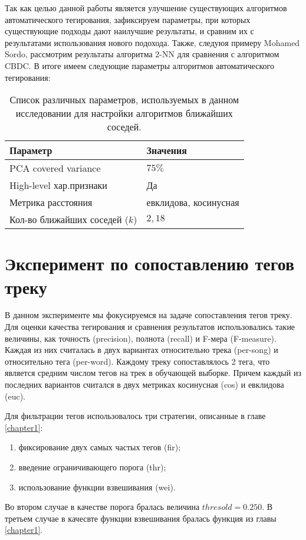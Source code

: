 Так как целью данной работы является улучшение существующих алгоритмов автоматического тегирования, зафиксируем параметры, при которых существующие подходы дают наилучшие результаты, 
и сравним их с результатами использования нового подохода. Также, следуюя примеру Mohamed Sordo, рассмотрим результаты алгоритма 2-NN для сравнения с алгоритмом CBDC.
В итоге имеем следующие параметры алгоритмов автоматического тегирования:
\begin{table}[ht]
\centering
\captionsetup{justification=centering}
\caption{Список различных параметров, используемых в данном исследовании для настройки алгоритмов ближайших соседей.}
\label{tab:new_algo_settings}
\begin{tabular}{ p{5cm}  p{4cm} }
  \hline    
  Параметр & Значения \\
  \hline    
  PCA covered variance & $75\%$ \\
  High-level хар.признаки & Да \\
  Метрика расстояния & евклидова, косинусная \\
  Кол-во ближайших соседей ($k$) & $2, 18$ \\
  \hline    
\end{tabular}
\end{table}

\section{Эксперимент по сопоставлению тегов треку}

В данном эксперименте мы фокусируемся на задаче сопоставления тегов треку. Для оценки качества тегирования и сравнения результатов использовались такие величины, как
точность (precision), полнота (recall) и F-мера (F-measure). Каждая из них считалась в двух вариантах \ld относительно трека (per-song) и относительно тега (per-word).
Каждому треку сопоставлялось 2 тега, что является средним числом тегов на трек в обучающей выборке. Причем каждый из последних вариантов считался в двух метриках \ld косинусная (cos) и евклидова (euc).

Для фильтрации тегов использовалось три стратегии, описанные в главе \ref{chapter1}:
\begin{enumerate}
 \item фиксирование двух самых частых тегов (fir);
 \item введение ограничивающего порога (thr);
 \item использование функции взвешивания (wei).
\end{enumerate}
Во втором случае в качестве порога бралась величина $thresold = 0.250$. В третьем случае в качесвте функции взвешивания бралась функция из главы \ref{chapter1}.

